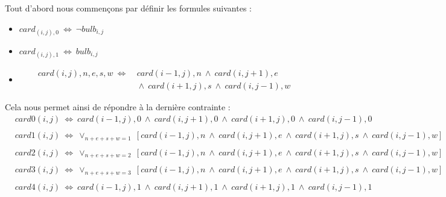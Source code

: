 \documentclass{article}
\begin{document}
Tout d'abord nous commen\c{c}ons par d\'efinir les formules suivantes :
\begin{itemize}
\item $ card_{(i,j),0} ~ \Leftrightarrow ~ \neg bulb_{i,j} $
\item $ card_{(i,j),1} ~ \Leftrightarrow ~ bulb_{i,j} $
\item 
\begin{align}
\nonumber card(i,j),n,e,s,w ~ \Leftrightarrow &~card(i-1,j),n ~ \wedge ~ card(i,j+1),e
\\ 
\nonumber
&~ \wedge ~ card(i+1,j),s ~ \wedge ~ card(i,j-1),w 
\end{align}
\end{itemize}
Cela nous permet ainsi de r\'epondre à la derni\`ere contrainte :
\begin{align}
\nonumber
&card0(i,j) ~ \Leftrightarrow ~ card(i-1,j),0 ~ \wedge ~ card(i,j+1),0~ \wedge ~ card(i+1,j),0 ~ \wedge ~ card(i,j-1),0\\
\nonumber
\\
\nonumber
&card1(i,j) ~ \Leftrightarrow ~ \vee_{n+e+s+w = 1} ~ [card(i-1,j),n ~ \wedge ~ card(i,j+1),e ~ \wedge ~ card(i+1,j),s ~ \wedge ~ card(i,j-1),w]\\
\nonumber
\\
\nonumber
&card2(i,j) ~ \Leftrightarrow ~ \vee_{n+e+s+w = 2} ~ [card(i-1,j),n ~ \wedge ~ card(i,j+1),e~ \wedge ~ card(i+1,j),s ~ \wedge ~ card(i,j-1),w]\\
\nonumber
\\
\nonumber
&card3(i,j) ~ \Leftrightarrow ~ \vee_{n+e+s+w = 3} ~ [card(i-1,j),n ~ \wedge ~ card(i,j+1),e~ \wedge ~ card(i+1,j),s ~ \wedge ~ card(i,j-1),w]\\
\nonumber
\\
\nonumber
&card4(i,j) ~ \Leftrightarrow ~ card(i-1,j),1 ~ \wedge ~ card(i,j+1),1 ~ \wedge ~ card(i+1,j),1 ~ \wedge ~ card(i,j-1),1\\
\nonumber
\end{align}
\end{document}
